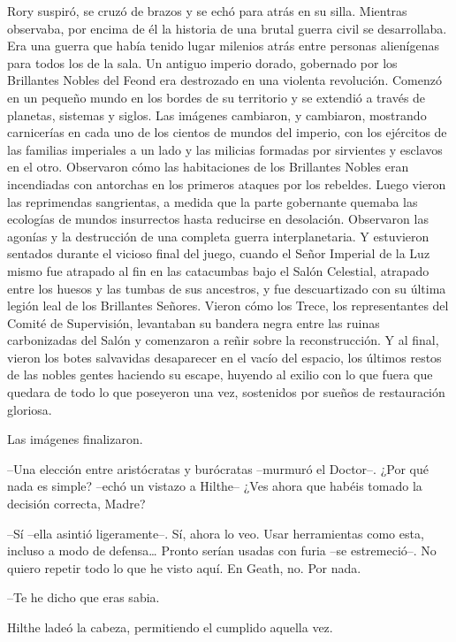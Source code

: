{Rory suspiró, se cruzó de brazos y se echó para atrás en su silla.
	Mientras observaba, por encima de él la historia de una brutal guerra
	civil se desarrollaba. Era una guerra que había tenido lugar milenios
	atrás entre personas alienígenas para todos los de la sala. Un antiguo
	imperio dorado, gobernado por los Brillantes Nobles del Feond era
	destrozado en una violenta revolución. Comenzó en un pequeño mundo en
	los bordes de su territorio y se extendió a través de planetas, sistemas
	y siglos. Las imágenes cambiaron, y cambiaron, mostrando carnicerías en
	cada uno de los cientos de mundos del imperio, con los ejércitos de las
	familias imperiales a un lado y las milicias formadas por sirvientes y
	esclavos en el otro. Observaron cómo las habitaciones de los Brillantes
	Nobles eran incendiadas con antorchas en los primeros ataques por los
	rebeldes. Luego vieron las reprimendas sangrientas, a medida que la
	parte gobernante quemaba las ecologías de mundos insurrectos hasta
	reducirse en desolación. Observaron las agonías y la destrucción de una
	completa guerra interplanetaria. Y estuvieron sentados durante el
	vicioso final del juego, cuando el Señor Imperial de la Luz mismo fue
	atrapado al fin en las catacumbas bajo el Salón Celestial, atrapado
	entre los huesos y las tumbas de sus ancestros, y fue descuartizado con
	su última legión leal de los Brillantes Señores. Vieron cómo los Trece,
	los representantes del Comité de Supervisión, levantaban su bandera
	negra entre las ruinas carbonizadas del Salón y comenzaron a reñir sobre
	la reconstrucción. Y al final, vieron los botes salvavidas desaparecer
	en el vacío del espacio, los últimos restos de las nobles gentes
	haciendo su escape, huyendo al exilio con lo que fuera que quedara de
	todo lo que poseyeron una vez, sostenidos por sueños de restauración
gloriosa.}

{Las imágenes finalizaron.}

{--Una elección entre aristócratas y burócratas --murmuró el Doctor--.
	¿Por qué nada es simple? --echó un vistazo a Hilthe-- ¿Ves ahora que
habéis tomado la decisión correcta, Madre?}

{--Sí --ella asintió ligeramente--. Sí, ahora lo veo. Usar
	herramientas como esta, incluso a modo de defensa\ldots{} Pronto serían
	usadas con furia --se estremeció--. No quiero repetir todo lo que he
visto aquí. En Geath, no. Por nada.}

{--Te he dicho que eras sabia.}

{Hilthe ladeó la cabeza, permitiendo el cumplido aquella vez.}

